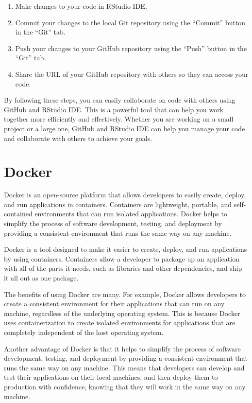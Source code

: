 \documentclass[
]{book}
\providecommand{\tightlist}{%
  \setlength{\itemsep}{0pt}\setlength{\parskip}{0pt}}
\begin{document}
\begin{enumerate}
\def\labelenumi{\arabic{enumi}.}
\tightlist
\item
  Make changes to your code in RStudio IDE.
\item
  Commit your changes to the local Git repository using the ``Commit'' button in the ``Git'' tab.
\item
  Push your changes to your GitHub repository using the ``Push'' button in the ``Git'' tab.
\item
  Share the URL of your GitHub repository with others so they can access your code.
\end{enumerate}

By following these steps, you can easily collaborate on code with others using GitHub and RStudio IDE. This is a powerful tool that can help you work together more efficiently and effectively. Whether you are working on a small project or a large one, GitHub and RStudio IDE can help you manage your code and collaborate with others to achieve your goals.

\hypertarget{docker}{%
\section{Docker}\label{docker}}

Docker is an open-source platform that allows developers to easily create, deploy, and run applications in containers. Containers are lightweight, portable, and self-contained environments that can run isolated applications. Docker helps to simplify the process of software development, testing, and deployment by providing a consistent environment that runs the same way on any machine.

Docker is a tool designed to make it easier to create, deploy, and run applications by using containers. Containers allow a developer to package up an application with all of the parts it needs, such as libraries and other dependencies, and ship it all out as one package.

The benefits of using Docker are many. For example, Docker allows developers to create a consistent environment for their applications that can run on any machine, regardless of the underlying operating system. This is because Docker uses containerization to create isolated environments for applications that are completely independent of the host operating system.

Another advantage of Docker is that it helps to simplify the process of software development, testing, and deployment by providing a consistent environment that runs the same way on any machine. This means that developers can develop and test their applications on their local machines, and then deploy them to production with confidence, knowing that they will work in the same way on any machine.
\end{document}

